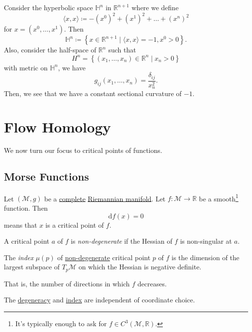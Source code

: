 Consider the hyperbolic space \(\mathbb{H} ^n\) in \(\mathbb{R} ^{n+1}\) where we define
\[
	\langle x, x \rangle \coloneqq -(x^0)^2 + (x^1)^2 + \dots + (x^n)^2
\]
for \(x=(x^0, \dots , x^1)\). Then
\[
	\mathbb{H} ^n \coloneqq \left\{ x\in \mathbb{R} ^{n+1} \mid \langle x, x \rangle = -1, x^0 > 0 \right\}.
\]
Also, consider the half-space of \(\mathbb{R} ^n\) such that
\[
	H^n = \left\{ (x_1, \dots , x_n)\in \mathbb{R} ^n \mid x_n > 0 \right\}
\]
with metric on \(\mathbb{H} ^n\), we have
\[
	g_{ij}(x_1, \dots , x_n) = \frac{\delta _{ij}}{x_n^2}.
\]
Then, we see that we have a constant sectional curvature of \(-1\).

\section{Flow Homology}
We now turn our focus to critical points of functions.

\subsection{Morse Functions}
Let \((\mathcal{M} , g)\) be a \hyperref[def:geodesically-complete]{complete} \hyperref[def:Riemannian-manifold]{Riemannian manifold}. Let \(f\colon \mathcal{M} \to \mathbb{R} \) be a smooth\footnote{It's typically enough to ask for \(f\in C^3(\mathcal{M} , \mathbb{R} )\).} function. Then
\[
	\mathrm{d} f(x) = 0
\]
means that \(x\) is a critical point of \(f\).

\begin{definition}\label{def:non-degenerate}
	A critical point \(a\) of \(f\) is \emph{non-degenerate} if the Hessian of \(f\) is non-singular at \(a\).
\end{definition}

\begin{definition}\label{def:Morse-index}
	The \emph{index} \(\mu (p)\) of \hyperref[def:non-degenerate]{non-degenerate} critical point \(p\) of \(f\) is the dimension of the largest subspace of \(T_p \mathcal{M} \) on which the Hessian is negative definite.
\end{definition}

\begin{intuition}
	That is, the number of directions in which \(f\) decreases.
\end{intuition}

\begin{note}
	The \hyperref[def:non-degenerate]{degeneracy} and \hyperref[def:Morse-index]{index} are independent of coordinate choice.
\end{note}

